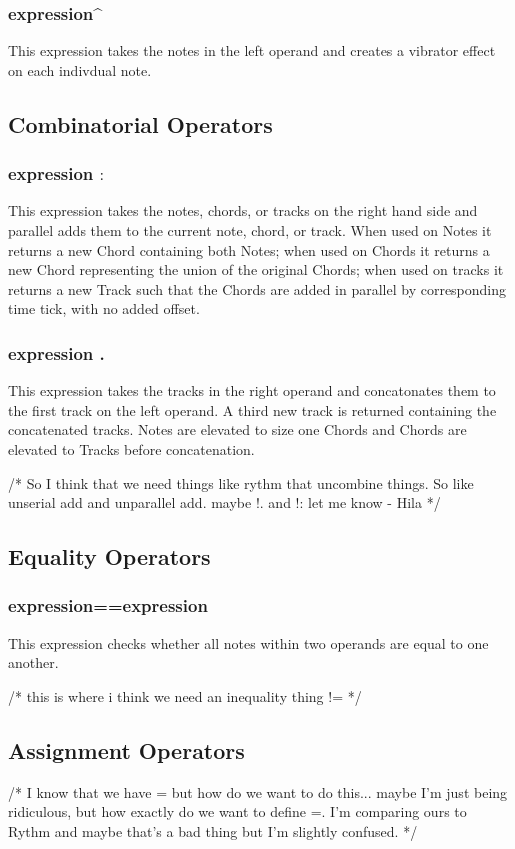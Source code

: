 \documentclass[letterpaper]{article}
\begin{document}
\subsubsection{expression\^{} }
This expression takes the notes in the left operand and creates a vibrator effect on each indivdual note. 

\subsection{Combinatorial Operators}
\subsubsection{expression $:$}
This expression takes the notes, chords, or tracks on the right hand side and parallel adds them to the current note, chord, or track. When used on Notes it returns a new Chord containing both Notes; when used on Chords it returns a new Chord representing the union of the original Chords; when used on tracks it returns a new Track such that the Chords are added in parallel by corresponding time tick, with no added offset. 

\subsubsection{expression .}
This expression takes the tracks in the right operand and concatonates them to the first track on the left operand. A third new track is returned containing the concatenated tracks. Notes are elevated to size one Chords and Chords are elevated to Tracks before concatenation. 

/* So I think that we need things like rythm that uncombine things. So like unserial add and unparallel add. maybe !. and !: let me know - Hila
*/

\subsection{Equality Operators}
\subsubsection{expression==expression}
This expression checks whether all notes within two operands are equal to one another. 

/* this is where i think we need an inequality thing != */ 

\subsection{Assignment Operators}
/* I know that we have = but how do we want to do this... maybe I'm just being ridiculous, but how exactly do we want to define =. I'm comparing ours to Rythm and maybe that's a bad thing but I'm slightly confused. */
\end{document}
